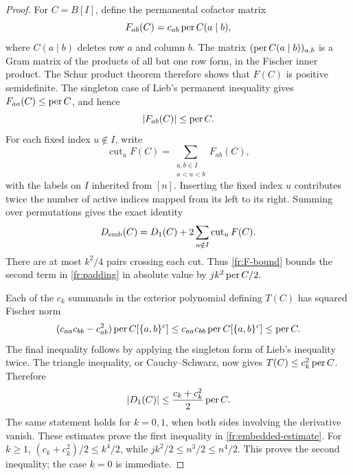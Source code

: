\begin{proof}
For \(C=B[I]\), define the permanental cofactor matrix
\[
 F_{ab}(C)=c_{ab}\operatorname{per} C(a\mid b),
\]
where \(C(a\mid b)\) deletes row \(a\) and column \(b\).
The matrix \((\operatorname{per} C(a\mid b))_{a,b}\) is a Gram matrix of the
products of all but one row form, in the Fischer inner product.
The Schur product theorem therefore shows that \(F(C)\) is positive
semidefinite. The singleton case of Lieb's permanent inequality
\cite{Lieb1966} gives
\(F_{aa}(C)\le\operatorname{per} C\), and hence
\begin{equation}\label{fr:F-bound}
 |F_{ab}(C)|\le\operatorname{per} C.
\end{equation}
For each fixed index \(u\notin I\), write
\[
 \operatorname{cut}_{u}F(C)
   =\sum_{\substack{a,b\in I\\a<u<b}}F_{ab}(C),
\]
with the labels on \(I\) inherited from \([n]\). Inserting the fixed
index \(u\) contributes twice the number of active indices mapped from
its left to its right. Summing over permutations gives the exact identity
\begin{equation}\label{fr:padding}
 D_{\rm emb}(C)=D_1(C)+2\sum_{u\notin I}\operatorname{cut}_{u}F(C).
\end{equation}
There are at most \(k^2/4\) pairs crossing each cut. Thus
\eqref{fr:F-bound} bounds the second term in \eqref{fr:padding} in
absolute value by \(jk^2\operatorname{per} C/2\).

Each of the \(c_k\) summands in the exterior polynomial defining
\(T(C)\) has squared Fischer norm
\[
 (c_{aa}c_{bb}-c_{ab}^2)\operatorname{per} C[\{a,b\}^c]
 \le c_{aa}c_{bb}\operatorname{per} C[\{a,b\}^c]\le\operatorname{per} C.
\]
The final inequality follows by applying the singleton form of Lieb's
inequality twice. The triangle inequality, or Cauchy--Schwarz, now gives
\(T(C)\le c_k^2\operatorname{per} C\). Therefore
\[
 |D_1(C)|\le\frac{c_k+c_k^2}{2}\operatorname{per} C.
\]
The same statement holds for \(k=0,1\), when both sides involving the
derivative vanish. These estimates prove the first inequality in
\eqref{fr:embedded-estimate}. For \(k\ge1\),
\((c_k+c_k^2)/2\le k^4/2\), while
\(jk^2/2\le n^3/2\le n^4/2\). This proves the second inequality;
the case \(k=0\) is immediate.
\end{proof}

